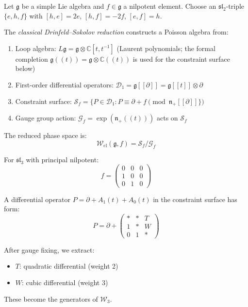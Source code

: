 \begin{definition}\label{def:classical-ds}
Let $\mathfrak{g}$ be a simple Lie algebra and $f \in \mathfrak{g}$ a nilpotent element. Choose an $\mathfrak{sl}_2$-triple $\{e, h, f\}$ with $[h,e] = 2e$, $[h,f] = -2f$, $[e,f] = h$.

The \emph{classical Drinfeld--Sokolov reduction} constructs a Poisson algebra from:
\begin{enumerate}
\item Loop algebra: $L\mathfrak{g} = \mathfrak{g} \otimes \mathbb{C}[t, t^{-1}]$ (Laurent polynomials; the formal completion $\mathfrak{g}((t)) = \mathfrak{g} \otimes \mathbb{C}((t))$ is used for the constraint surface below)
\item First-order differential operators: $\mathcal{D}_1 = \mathfrak{g}[[\partial]] = \mathfrak{g}[[t]] \otimes \partial$
\item Constraint surface: $\mathcal{S}_f = \{P \in \mathcal{D}_1 : P \equiv \partial + f \pmod{\mathfrak{n}_+[[\partial]]\}}$
\item Gauge group action: $\mathcal{G}_f = \exp(\mathfrak{n}_+((t)))$ acts on $\mathcal{S}_f$
\end{enumerate}

The reduced phase space is:
\begin{equation}
\mathcal{W}_{\text{cl}}(\mathfrak{g}, f) = \mathcal{S}_f / \mathcal{G}_f
\end{equation}
\end{definition}

\begin{example}
For $\mathfrak{sl}_3$ with principal nilpotent:
\begin{equation}
f = \begin{pmatrix} 0 & 0 & 0 \\ 1 & 0 & 0 \\ 0 & 1 & 0 \end{pmatrix}
\end{equation}

A differential operator $P = \partial + A_1(t) + A_0(t)$ in the constraint surface has form:
\begin{equation}
P = \partial + \begin{pmatrix} * & * & T \\ 1 & * & W \\ 0 & 1 & * \end{pmatrix}
\end{equation}

After gauge fixing, we extract:
\begin{itemize}
\item $T$: quadratic differential (weight 2)
\item $W$: cubic differential (weight 3)
\end{itemize}
These become the generators of $\mathcal{W}_3$.
\end{example}

